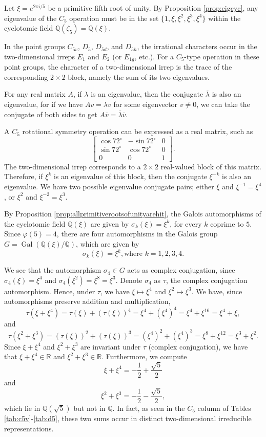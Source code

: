 \documentclass{article}
\DeclareMathOperator{\Gal}{Gal}
\begin{document}
    Let $\xi=e^{2\pi i/5}$ be a primitive fifth root of unity. By Proposition \ref{prop:eigcyc}, any eigenvalue of the $C_5$ operation must be in the set $\{1, \xi, \xi^2, \xi^3, \xi^4\}$ within the cyclotomic field $\mathbb{Q}(\zeta_5)=\mathbb{Q}(\xi)$.

    In the point groups $C_{5v}$, $D_5$, $D_{5d}$, and $D_{5h}$, the irrational characters occur in the two-dimensional irreps $E_1$ and $E_2$ (or $E_{1g}$, etc.). For a $C_5$-type operation in these point groups, the character of a two-dimensional irrep is the trace of the corresponding $2\times 2$ block, namely the sum of its two eigenvalues.

    For any real matrix $A$, if $\lambda$ is an eigenvalue, then the conjugate $\overline\lambda$ is also an eigenvalue, for if we have $Av=\lambda v$ for some eigenvector $v\neq 0$, we can take the conjugate of both sides to get $A\overline v=\overline\lambda \overline v$.
    
    A $C_5$ rotational symmetry operation can be expressed as a real matrix, such as \[\begin{bmatrix}\cos 72^\circ&-\sin72^\circ&0\\\sin72^\circ&\cos72^\circ&0\\0&0&1\end{bmatrix}.\] The two-dimensional irrep corresponds to a $2\times 2$ real-valued block of this matrix. Therefore, if $\xi^k$ is an eigenvalue of this block, then the conjugate $\xi^{-k}$ is also an eigenvalue. We have two possible eigenvalue conjugate pairs; either $\xi$ and $\xi^{-1}=\xi^4$, or $\xi^2$ and $\xi^{-2}=\xi^3$.
    
    By Proposition \ref{prop:allprimitiverootsofunityarehit}, the Galois automorphisms of the cyclotomic field $\mathbb{Q}(\xi)$ are given by $\sigma_k(\xi)=\xi^k$, for every $k$ coprime to $5$. Since $\varphi(5)=4$, there are four automorphisms in the Galois group $G=\Gal(\mathbb{Q}(\xi)/\mathbb{Q})$, which are given by
    \[\sigma_k(\xi)=\xi^k, \text{where } k=1,2,3,4.\]
    
    \pagebreak
    
    We see that the automorphism $\sigma_4\in G$ acts as complex conjugation, since $\sigma_4(\xi)=\xi^4$ and $\sigma_4(\xi^2)=\xi^8=\xi^3$. Denote $\sigma_4$ as $\tau$, the complex conjugation automorphism. Hence, under $\tau$, we have $\xi\mapsto\xi^4$ and $\xi^2\mapsto\xi^3$. We have, since automorphisms preserve addition and multiplication, \[\tau(\xi+\xi^4)=\tau(\xi)+(\tau(\xi))^4=\xi^4+(\xi^4)^4=\xi^4+\xi^{16}=\xi^4+\xi,\] and \[\tau(\xi^2+\xi^3)=(\tau(\xi))^2+(\tau(\xi))^3=(\xi^4)^2+(\xi^4)^3=\xi^8+\xi^{12}=\xi^3+\xi^2.\] Since $\xi+\xi^4$ and $\xi^2+\xi^3$ are invariant under $\tau$ (complex conjugation), we have that $\xi+\xi^4\in\mathbb{R}$ and $\xi^2+\xi^3\in\mathbb{R}$. Furthermore, we compute \[\xi+\xi^4=-\frac12+\frac{\sqrt5}{2}\] and \[\xi^2+\xi^3=-\frac12-\frac{\sqrt5}{2},\] which lie in $\mathbb{Q}(\sqrt{5})$ but not in $\mathbb{Q}$. In fact, as seen in the $C_5$ column of Tables \ref{tab:c5v}-\ref{tab:d5}, these two sums occur in distinct two-dimensional irreducible representations.
\end{document}
